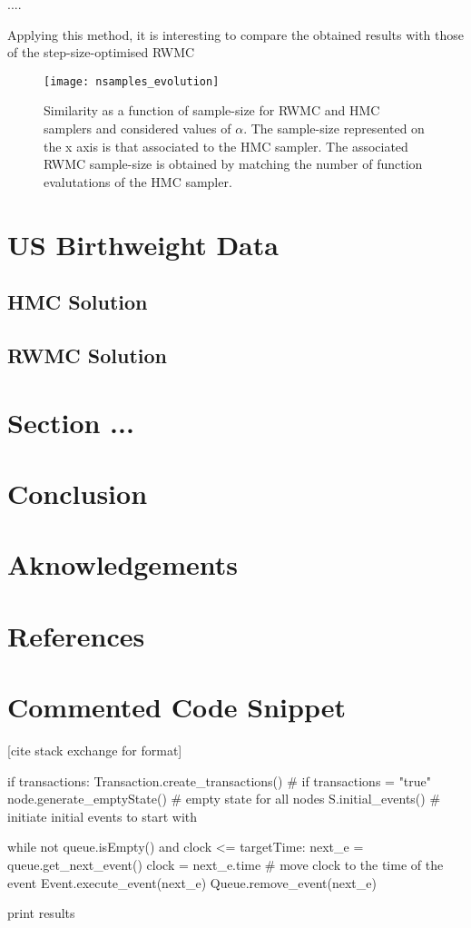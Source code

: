\documentclass[a4paper, 12pt,oneside]{article}
\begin{document}
		....

		Applying this method, it is interesting to compare the obtained results with those of the step-size-optimised RWMC 
		\begin{figure}[htb]
			\centering
				\vspace{0em}
				\texttt{[image: nsamples\_evolution]}
				\caption{Similarity as a function of sample-size for RWMC and HMC samplers and considered values of $\alpha$. The sample-size represented on the x axis is that associated to the HMC sampler. The associated RWMC sample-size is obtained by matching the number of function evalutations of the HMC sampler.}
				\label{fig:nsamples-evolution}
		\end{figure}
		\lipsum[1]
	\section{US Birthweight Data}
		\subsection{HMC Solution}
		\subsection{RWMC Solution}
	\section{Section ...}
	\section{Conclusion}
	\section*{Aknowledgements}
	\section*{References}
	\appendix
		\section{Commented Code Snippet}\label{appendix:commented-code-snippet}
			[cite stack exchange for format]
			\begin{python}
			if transactions: Transaction.create_transactions() # if transactions = "true"
			node.generate_emptyState() # empty state for all nodes
			S.initial_events() # initiate initial events to start with

			while not queue.isEmpty() and clock <= targetTime:
				next_e = queue.get_next_event()
				clock = next_e.time # move clock to the time of the event
				Event.execute_event(next_e)
				Queue.remove_event(next_e)

			print results
			\end{python}
\end{document}

